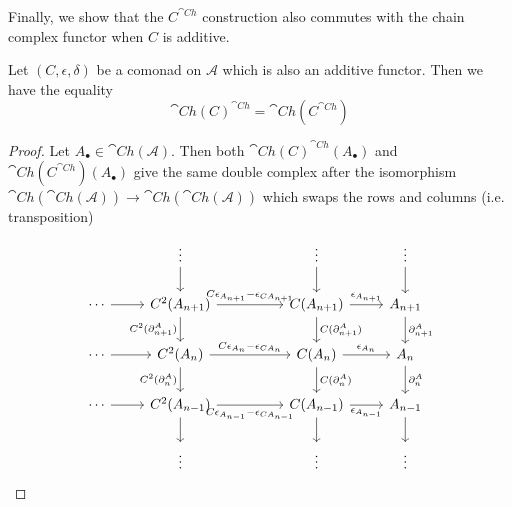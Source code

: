 Finally, we show that the $C^{\cat{Ch}}$ construction also commutes with the chain complex functor when $C$ is additive.

\begin{lem}[label=lem:ChConsPtwise]
    Let $(C,\epsilon,\delta)$ be a comonad on $\mathcal{A}$ which is also an additive functor. Then we have the equality
    \begin{equation*}
        \cat{Ch}(C)^{\cat{Ch}} = \cat{Ch}(C^{\cat{Ch}})
    \end{equation*}
\end{lem}
\begin{proof}
    Let $A_\bullet \in \cat{Ch}(\mathcal{A})$. Then both $\cat{Ch}(C)^{\cat{Ch}}(A_\bullet)$ and $\cat{Ch}(C^{\cat{Ch}})(A_\bullet)$ give the same double complex after the isomorphism $\cat{Ch}(\cat{Ch}(\mathcal{A}))\to \cat{Ch}(\cat{Ch}(\mathcal{A}))$ which swaps the rows and columns (i.e. transposition)
    \[\begin{tikzcd}
        & \vdots && \vdots & \vdots \\
        \cdots & {C^2(A_{n+1})} && {C(A_{n+1})} & {A_{n+1}} \\
        \cdots & {C^2(A_n)} && {C(A_n)} & {A_n} \\
        \cdots & {C^2(A_{n-1})} && {C(A_{n-1})} & {A_{n-1}} \\
        & \vdots && \vdots & \vdots
        \arrow["{C^2(\partial_{n+1}^A)}"', from=2-2, to=3-2]
        \arrow["{C^2(\partial_n^A)}"', from=3-2, to=4-2]
        \arrow["{C(\partial_{n+1}^A)}", from=2-4, to=3-4]
        \arrow["{C(\partial_n^A)}", from=3-4, to=4-4]
        \arrow["{\partial_{n+1}^A}", from=2-5, to=3-5]
        \arrow["{\partial_n^A}", from=3-5, to=4-5]
        \arrow["{C\epsilon_{A_n}-\epsilon_{CA_n}}", from=3-2, to=3-4]
        \arrow["{\epsilon_{A_n}}", from=3-4, to=3-5]
        \arrow["{\epsilon_{A_{n-1}}}"', from=4-4, to=4-5]
        \arrow["{\epsilon_{A_{n+1}}}", from=2-4, to=2-5]
        \arrow["{C\epsilon_{A_{n+1}}-\epsilon_{CA_{n+1}}}", from=2-2, to=2-4]
        \arrow["{C\epsilon_{A_{n-1}}-\epsilon_{CA_{n-1}}}"', from=4-2, to=4-4]
        \arrow[from=4-2, to=5-2]
        \arrow[from=4-4, to=5-4]
        \arrow[from=4-5, to=5-5]
        \arrow[from=1-5, to=2-5]
        \arrow[from=1-4, to=2-4]
        \arrow[from=1-2, to=2-2]
        \arrow[from=2-1, to=2-2]
        \arrow[from=3-1, to=3-2]
        \arrow[from=4-1, to=4-2]
    \end{tikzcd}\]
\end{proof}

